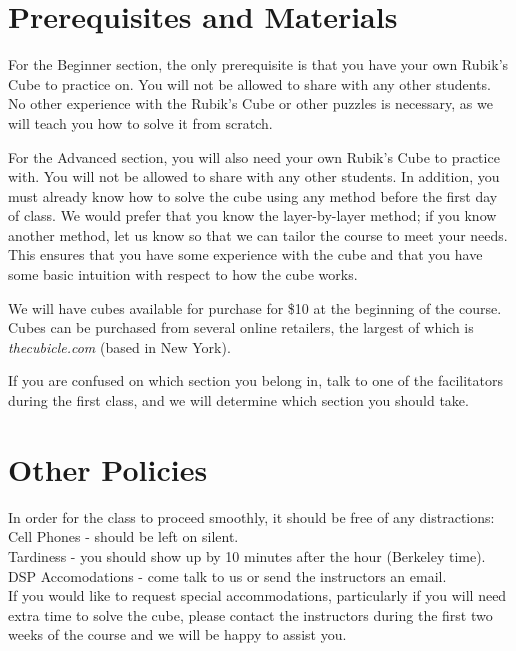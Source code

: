 \documentclass[11pt]{article}
\begin{document}
\section*{Prerequisites and Materials}
For the Beginner section, the only prerequisite is that you have your own Rubik’s Cube to practice on. You will not be allowed to share with any other students. No other experience with the Rubik’s Cube or other puzzles is necessary, as we will teach you how to solve it from scratch.

For the Advanced section, you will also need your own Rubik’s Cube to practice with. You will not be allowed to share with any other students. In addition, you must already know how to solve the cube using any method before the first day of class. We would prefer that you know the layer-by-layer method; if you know another method, let us know so that we can tailor the course to meet your needs. This ensures that you have some experience with the cube and that you have some basic intuition with respect to how the cube works.

We will have cubes available for purchase for \$10 at the beginning of the course. Cubes can be purchased from several online retailers, the largest of which is \textit{thecubicle.com} (based in New York).

If you are confused on which section you belong in, talk to one of the facilitators during the first class, and we will determine which section you should take.

\section*{Other Policies}
In order for the class to proceed smoothly, it should be free of any distractions: \\
Cell Phones - should be left on silent.\\
Tardiness - you should show up by 10 minutes after the hour (Berkeley time).\\
DSP Accomodations - come talk to us or send the instructors an email.\\
If you would like to request special accommodations, particularly if you will need extra time to solve the cube, please contact the instructors during the first two weeks of the course and we will be happy to assist you.
\end{document}
